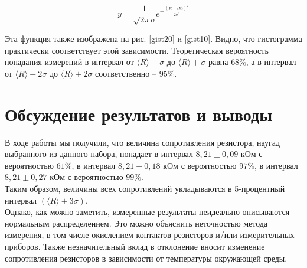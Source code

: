 \documentclass[a4paper,12pt]{article} %
\begin{document}
\begin{equation}
y = \frac{1}{\sqrt{2\pi} \sigma} e^{-\frac{\left(R - \langle R \rangle \right)^2}{2\sigma^2}}
\end{equation}

Эта функция также изображена на рис. \ref{gist20} и \ref{gist10}. Видно, что гистограмма практически соответствует этой зависимости. Теоретическая вероятность попадания измерений в интервал от $ \langle R \rangle - \sigma $ до $ \langle R \rangle + \sigma $ равна $ 68\% $, а в интервал от $ \langle R \rangle - 2\sigma $ до $ \langle R \rangle + 2\sigma $ соответственно -- $ 95\% $.

\section{Обсуждение результатов и выводы}

В ходе работы мы получили, что величина сопротивления резистора, наугад выбранного из данного набора, попадает в интервал $ 8,21 \pm 0,09 $ кОм с вероятностью $ 61\% $,  в интервал $ 8,21 \pm 0,18 $ кОм с вероятностью $ 97\% $,  в интервал $ 8,21 \pm 0,27 $ кОм с вероятностью $ 99\% $.\\

\noindent Таким образом, величины всех сопротивлений укладываются в 5-процентный интервал $ \left( \langle R \rangle \pm 3\sigma \right)  $.\\

\noindent Однако, как можно заметить, измеренные результаты неидеально описываются нормальным распределением. Это можно объяснить неточностью метода измерения, в том числе окислением контактов резисторов и/или измерительных приборов. Также незначительный вклад в отклонение вносит изменение сопротивления резисторов в зависимости от температуры окружающей среды.
\end{document}
